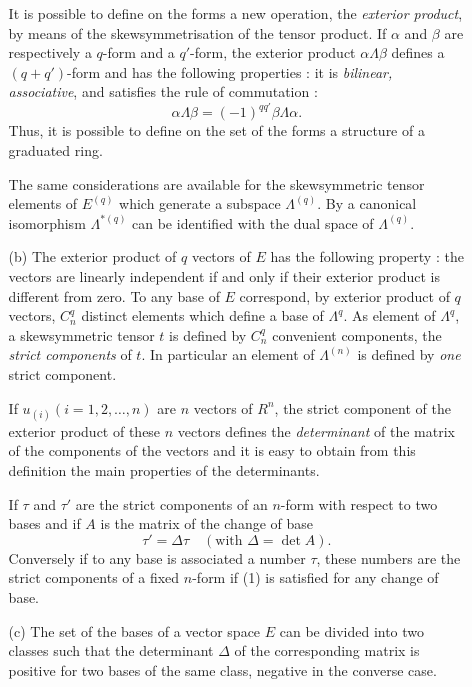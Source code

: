 \begin{enumerate}
\begin{itemize}
It is possible to define on the forms a new operation, the
\textit{exterior product}, by means of the skewsymmetrisation of the
tensor product. If $\alpha$ and $\beta$ are respectively a $q$-form
and a $q'$-form, the exterior product $\alpha \Lambda \beta$ defines a
$(q+q')$-form and has the following properties : it is
\textit{bilinear, associative}, and satisfies the rule of commutation :
$$
\alpha \Lambda \beta = (-1)^{qq'} \beta \Lambda \alpha.
$$\pageoriginale
Thus, it is possible to define on the set of the forms a structure of
a graduated ring.

The same considerations are available for the skewsymmetric  tensor
elements of $E^{(q)}$ which generate a subspace $\Lambda^{(q)}$. By a
canonical isomorphism $\Lambda^{\ast(q)}$ can be identified with the
dual space of $\Lambda^{(q)}$.

\item[(b)] The exterior product of $q$ vectors of $E$ has the
  following property : the vectors are linearly independent if and
  only if their exterior product is different from zero. To any base
  of $E$ correspond, by exterior product of $q$ vectors, $C^q_n$
  distinct elements which define a base of $\Lambda^q$. As element of
  $\Lambda^q$, a skewsymmetric tensor $t$ is defined by $C^q_n$
  convenient components, the \textit{strict components} of $t$. In
  particular an element of $\Lambda^{(n)}$ is defined by \textit{one}
  strict component. 

If $u_{(i)} (i = 1, 2, \ldots, n)$ are $n$ vectors of $R^n$, the
strict component of the exterior product of these $n$ vectors defines
the \textit{determinant} of the matrix of the components of the
vectors and it is easy to obtain from this definition the main
properties of the determinants.

If $\tau$ and $\tau'$ are the strict components of an $n$-form with
respect to two bases and if $A$ is the matrix of the change of base
\begin{equation*}
\tau' =\Delta \tau \quad (\text{with } \Delta = \det A). \tag{1}
\end{equation*}
Conversely if to any base is associated a number $\tau$, these numbers
are the strict components of a fixed $n$-form if (1) is satisfied for
any change of base.
 
\item[(c)] The set of the bases of a vector space $E$ can be divided
  into two classes such that the determinant $\Delta$ of the
  corresponding matrix is positive for two bases of the same class,
  negative in the converse case.


\end{itemize}
\end{enumerate}

